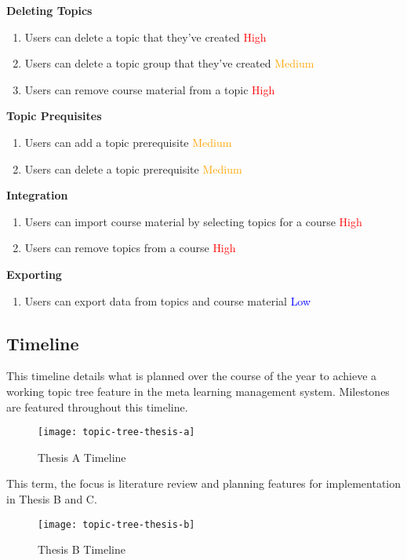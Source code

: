 \textbf{Deleting Topics}
    \begin{enumerate}
    \item Users can delete a topic that they've created \textcolor{Red}{High}
    \item Users can delete a topic group that they've created \textcolor{Orange}{Medium}
    \item Users can remove course material from a topic \textcolor{Red}{High}
    \end{enumerate}

\textbf{Topic Prequisites}
    \begin{enumerate}
    \item Users can add a topic prerequisite \textcolor{Orange}{Medium}
    \item Users can delete a topic prerequisite \textcolor{Orange}{Medium}
    \end{enumerate}

\textbf{Integration}
    \begin{enumerate}
    \item Users can import course material by selecting topics for a course \textcolor{Red}{High}
    \item Users can remove topics from a course \textcolor{Red}{High}
    \end{enumerate}

\textbf{Exporting}
    \begin{enumerate}
    \item Users can export data from topics and course material \textcolor{Blue}{Low}
    \end{enumerate}

\subsection{Timeline}
This timeline details what is planned over the course of the year to achieve a working topic tree feature in the meta learning management system.
Milestones are featured throughout this timeline.

\newpage

\begin{figure}[h!]
    \centering
    \texttt{[image: topic-tree-thesis-a]}
    \caption{Thesis A Timeline}
\end{figure}

This term, the focus is literature review and planning features for implementation in Thesis B and C.


\begin{figure}[h!]
    \centering
    \texttt{[image: topic-tree-thesis-b]}
    \caption{Thesis B Timeline}
\end{figure}


